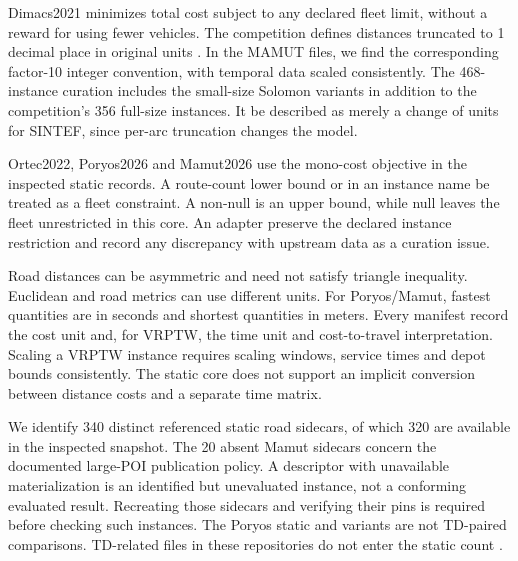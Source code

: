 Dimacs2021 minimizes total cost subject to any declared fleet limit, without a reward for using fewer vehicles. The competition defines distances truncated to 1 decimal place in original units \autocite{dimacsVRPTWRules2021}. In the MAMUT files, we find the corresponding factor-10 integer convention, with temporal data scaled consistently. The 468-instance curation includes the small-size Solomon variants in addition to the competition's 356 full-size instances. It \mustnot{} be described as merely a change of units for SINTEF, since per-arc truncation changes the model.

Ortec2022, Poryos2026 and Mamut2026 use the mono-cost objective in the inspected static records. A route-count lower bound or  in an instance name \mustnot{} be treated as a fleet constraint. A non-null  is an upper bound, while null leaves the fleet unrestricted in this core. An adapter \must{} preserve the declared instance restriction and record any discrepancy with upstream data as a curation issue.

Road distances can be asymmetric and need not satisfy triangle inequality. Euclidean and road metrics can use different units. For Poryos/Mamut, fastest quantities are in seconds and shortest quantities in meters. Every manifest \must{} record the cost unit and, for VRPTW, the time unit and cost-to-travel interpretation. Scaling a VRPTW instance requires scaling windows, service times and depot bounds consistently. The static core does not support an implicit conversion between distance costs and a separate time matrix.

We identify 340 distinct referenced static road sidecars, of which 320 are available in the inspected snapshot. The 20 absent Mamut sidecars concern the documented large-POI publication policy. A descriptor with unavailable materialization is an identified but unevaluated instance, not a conforming evaluated result. Recreating those sidecars and verifying their pins is required before checking such instances. The Poryos static  and  variants are not TD-paired comparisons. TD-related files in these repositories do not enter the static count \autocite{pichonPoryos2026,pichonMamut2026}.

